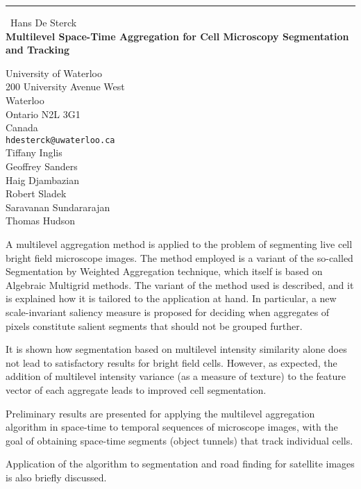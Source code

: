 \documentclass{report}
\begin{document}
\begin{center}
\rule{6in}{1pt} \
{\large Hans De Sterck \\
{\bf Multilevel Space-Time Aggregation for Cell Microscopy Segmentation and Tracking}}

University of Waterloo \\ 200 University Avenue West \\ Waterloo \\ Ontario N2L 3G1 \\ Canada
\\
{\tt hdesterck@uwaterloo.ca}\\
Tiffany Inglis\\
Geoffrey Sanders\\
Haig Djambazian\\
Robert Sladek\\
Saravanan Sundararajan\\
Thomas Hudson\end{center}

A multilevel aggregation method is applied to the problem of segmenting
live cell bright field microscope images.
The method employed is a variant of the so-called Segmentation by
Weighted Aggregation technique, which itself is based on Algebraic
Multigrid methods. The variant of the method used is described, and it is
explained how it is tailored to the application at hand. In particular, a
new scale-invariant saliency measure is proposed for deciding when
aggregates of pixels constitute salient segments that should not be
grouped further.

It is shown how segmentation based on multilevel intensity similarity
alone does not lead to satisfactory results for bright field cells.
However, as expected, the addition of multilevel intensity variance (as a
measure of texture) to the feature vector of each aggregate leads to
improved cell segmentation.

Preliminary results are presented for applying the multilevel aggregation
algorithm in space-time to temporal sequences of microscope images, with
the goal of obtaining space-time segments (object tunnels) that track
individual cells.

Application of the algorithm to segmentation and road finding for
satellite images is also briefly discussed.
\end{document}

